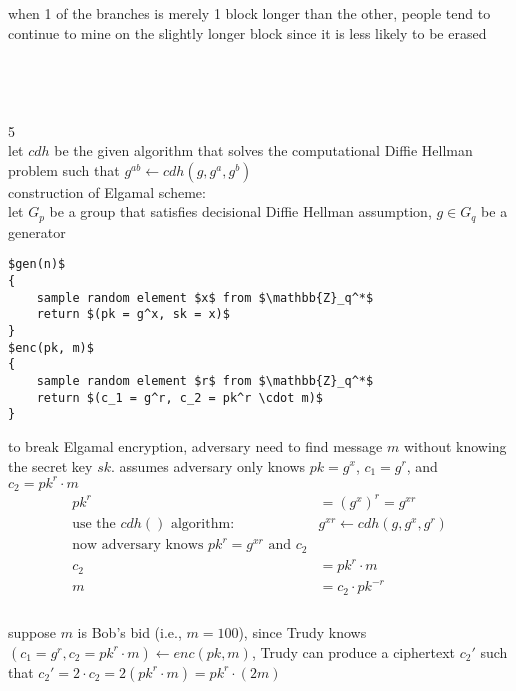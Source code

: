 \documentclass[12pt,border=4pt,multi]{article} %
\begin{document}
when 1 of the branches is merely 1 block longer than the other, people tend to continue to mine on the slightly longer block since it is less likely to be erased\\ 
\\
\\
\\
\\
5\\
let $cdh$ be the given algorithm that solves the computational Diffie Hellman problem such that $g^{ab} \leftarrow cdh(g, g^a, g^b)$\\
construction of Elgamal scheme:\\
let $G_p$ be a group that satisfies decisional Diffie Hellman assumption, $g \in G_q$ be a generator
\begin{lstlisting}[mathescape = true]
$gen(n)$
{
    sample random element $x$ from $\mathbb{Z}_q^*$
    return $(pk = g^x, sk = x)$
}
$enc(pk, m)$
{
    sample random element $r$ from $\mathbb{Z}_q^*$
    return $(c_1 = g^r, c_2 = pk^r \cdot m)$
}
\end{lstlisting}
to break Elgamal encryption, adversary need to find message $m$ without knowing the secret key $sk$. assumes adversary only knows $pk = g^x$, $c_1 = g^r$, and $c_2 = pk^r \cdot m$\\
\begin{align*}
pk^r &= (g^x)^r = g^{xr}\\
\text{use the $cdh()$ algorithm: } & g^{xr} \leftarrow cdh(g, g^x, g^r)\\
\text{now adversary knows $pk^r = g^{xr}$ and $c_2$} &\\
c_2 &= pk^r \cdot m\\
m &= c_2 \cdot pk^{-r}\\
\end{align*}
\newpage
{}\\
suppose $m$ is Bob's bid (i.e., $m = 100$), since Trudy knows $(c_1 = g^r, c_2 = pk^r \cdot m) \leftarrow enc(pk, m)$, Trudy can produce a ciphertext $c_2'$ such that $c_2' = 2 \cdot c_2 = 2(pk^r \cdot m) = pk^r \cdot (2m)$
\end{document}
